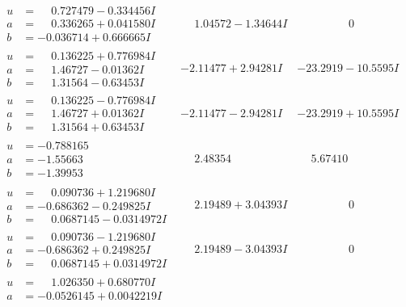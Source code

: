\documentclass[1p]{elsarticle_modified}
\theoremstyle{definition}
\begin{document}
$$\begin{array}{c|c|c}
\begin{aligned}
u &= \phantom{-}0.727479 - 0.334456 I \\
a &= \phantom{-}0.336265 + 0.041580 I \\
b &= -0.036714 + 0.666665 I\end{aligned}
 & \phantom{-}1.04572 - 1.34644 I & \phantom{-0.000000 } 0 \\ \hline\begin{aligned}
u &= \phantom{-}0.136225 + 0.776984 I \\
a &= \phantom{-}1.46727 - 0.01362 I \\
b &= \phantom{-}1.31564 - 0.63453 I\end{aligned}
 & -2.11477 + 2.94281 I & -23.2919 - 10.5595 I \\ \hline\begin{aligned}
u &= \phantom{-}0.136225 - 0.776984 I \\
a &= \phantom{-}1.46727 + 0.01362 I \\
b &= \phantom{-}1.31564 + 0.63453 I\end{aligned}
 & -2.11477 - 2.94281 I & -23.2919 + 10.5595 I \\ \hline\begin{aligned}
u &= -0.788165\phantom{ +0.000000I} \\
a &= -1.55663\phantom{ +0.000000I} \\
b &= -1.39953\phantom{ +0.000000I}\end{aligned}
 & \phantom{-}2.48354\phantom{ +0.000000I} & \phantom{-}5.67410\phantom{ +0.000000I} \\ \hline\begin{aligned}
u &= \phantom{-}0.090736 + 1.219680 I \\
a &= -0.686362 - 0.249825 I \\
b &= \phantom{-}0.0687145 - 0.0314972 I\end{aligned}
 & \phantom{-}2.19489 + 3.04393 I & \phantom{-0.000000 } 0 \\ \hline\begin{aligned}
u &= \phantom{-}0.090736 - 1.219680 I \\
a &= -0.686362 + 0.249825 I \\
b &= \phantom{-}0.0687145 + 0.0314972 I\end{aligned}
 & \phantom{-}2.19489 - 3.04393 I & \phantom{-0.000000 } 0 \\ \hline\begin{aligned}
u &= \phantom{-}1.026350 + 0.680770 I \\
a &= -0.0526145 + 0.0042219 I \\

\end{aligned}
\end{array}$$
\end{document}
